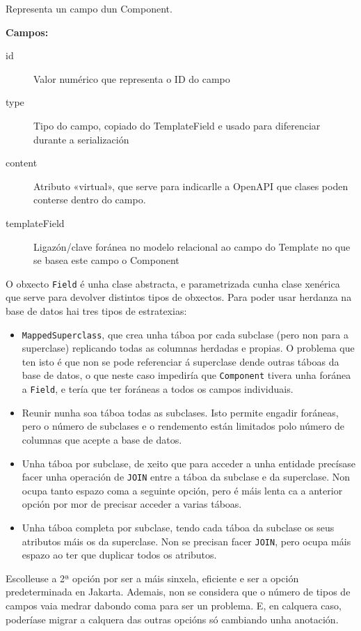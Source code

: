Representa un campo dun \Gls{Component}.

\textbf{Campos:}

\begin{description}
    \item[id] Valor numérico que representa o ID do campo
    \item[type] Tipo do campo, copiado do \Gls{TemplateField} e usado para diferenciar durante a serialización
    \item[content] Atributo «virtual», que serve para indicarlle a OpenAPI que clases poden conterse dentro do campo.
    \item[templateField] Ligazón/clave foránea no modelo relacional ao campo do \Gls{Template} no que se basea este campo o \Gls{Component} 
\end{description}

O obxecto \texttt{Field} é unha clase abstracta, e parametrizada cunha clase xenérica que serve para devolver distintos tipos de obxectos. Para poder usar herdanza na base de datos hai tres tipos de estratexias:\cite{herdanza}

\begin{itemize}
	\item \texttt{MappedSuperclass}, que crea unha táboa por cada subclase (pero non para a superclase) replicando todas as columnas herdadas e propias. O problema que ten isto é que non se pode referenciar á superclase dende outras táboas da base de datos, o que neste caso impediría que \texttt{Component} tivera unha foránea a \texttt{Field}, e tería que ter foráneas a todos os campos individuais.
	\item Reunir nunha soa táboa todas as subclases. Isto permite engadir foráneas, pero o número de subclases e o rendemento están limitados polo número de columnas que acepte a base de datos.
	\item Unha táboa por subclase, de xeito que para acceder a unha entidade precísase facer unha operación de \texttt{JOIN} entre a táboa da subclase e da superclase. Non ocupa tanto espazo coma a seguinte opción, pero é máis lenta ca a anterior opción por mor de precisar acceder a varias táboas.
	\item Unha táboa completa por subclase, tendo cada táboa da subclase os seus atributos máis os da superclase. Non se precisan facer \texttt{JOIN}, pero ocupa máis espazo ao ter que duplicar todos os atributos.
\end{itemize}

Escolleuse a 2ª opción por ser a máis sinxela, eficiente e ser a opción predeterminada en Jakarta. Ademais, non se considera que o número de tipos de campos vaia medrar dabondo coma para ser un problema. E, en calquera caso, poderíase migrar a calquera das outras opcións só cambiando unha anotación.

